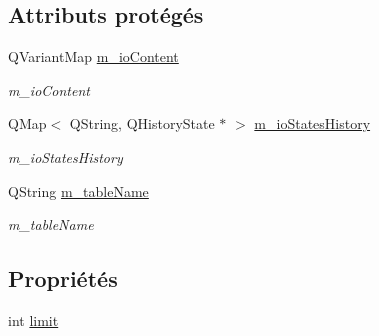 \subsection*{Attributs protégés}
\begin{DoxyCompactItemize}
\item 
Q\-Variant\-Map \hyperlink{classSH__InOutStateMachine_a661a1c7bd3b1086b3b5cd60ca957ecbd}{m\-\_\-io\-Content}
\begin{DoxyCompactList}\small\item\em m\-\_\-io\-Content \end{DoxyCompactList}\item 
Q\-Map$<$ Q\-String, Q\-History\-State $\ast$ $>$ \hyperlink{classSH__InOutStateMachine_aaca2ea542b3f5b4cd238396b07492455}{m\-\_\-io\-States\-History}
\begin{DoxyCompactList}\small\item\em m\-\_\-io\-States\-History \end{DoxyCompactList}\item 
Q\-String \hyperlink{classSH__InOutStateMachine_acc0f5d5133af2dcca30939f53ec8837b}{m\-\_\-table\-Name}
\begin{DoxyCompactList}\small\item\em m\-\_\-table\-Name \end{DoxyCompactList}\end{DoxyCompactItemize}
\subsection*{Propriétés}
\begin{DoxyCompactItemize}
\item 
int \hyperlink{classSh__LoopingInOutStateMachine_aa015094a00155fc04a1859da5545acc9}{limit}
\end{DoxyCompactItemize}
